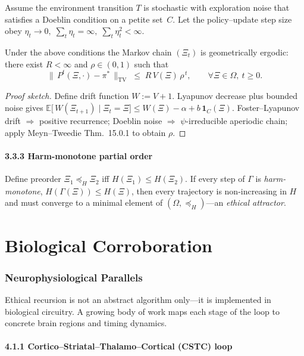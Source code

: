Assume the environment transition $T$ is stochastic with exploration
noise that satisfies a Doeblin condition on a petite set~$C$.
Let the policy–update step size obey
$\eta_t\!\rightarrow\!0,\;
\sum_t\eta_t=\infty,\;
\sum_t\eta_t^2<\infty$.
\begin{theorem}
\label{thm:ergodic}
Under the above conditions the Markov
chain $(\Xi_t)$ is geometrically ergodic:
there exist $R<\infty$ and $\rho\in(0,1)$ such that
\[
  \bigl\|\,P^t(\Xi,\cdot)-\pi^\ast\,\bigr\|_{\mathrm{TV}}
  \;\le\; R\,V(\Xi)\,\rho^{\,t}\!,
  \qquad \forall \Xi\in\Omega,\ t\ge0.
\]
\end{theorem}

\begin{proof}[Proof sketch]
Define drift function $W:=V+1$.
Lyapunov decrease plus bounded noise gives
$\mathbb{E}\!\bigl[\,W(\Xi_{t+1})\mid\Xi_t=\Xi\bigr]\le
W(\Xi)-\alpha+b\,\mathbf 1_C(\Xi)$.
Foster–Lyapunov drift $\Rightarrow$ positive recurrence; Doeblin
noise $\Rightarrow$ $\psi$-irreducible aperiodic chain;
apply Meyn–Tweedie Thm.~15.0.1 to obtain $\rho$.
\end{proof}

\paragraph{3.3.3 Harm-monotone partial order}

Define preorder $\Xi_1\preceq_H \Xi_2$ iff $H(\Xi_1)\le H(\Xi_2)$.
If every step of $\Gamma$ is \emph{harm-monotone},
$H(\Gamma(\Xi))\le H(\Xi)$, then every trajectory
is non-increasing in $H$ and must converge to a minimal element of
$(\Omega,\preceq_H)$—an \emph{ethical attractor}.

\section*{Biological Corroboration}

\subsubsection{Neurophysiological Parallels}
\label{sec:neuro}

Ethical recursion is not an abstract algorithm only---it is implemented
in biological circuitry.  A growing body of work maps each stage of the
loop to concrete brain regions and timing dynamics.

\paragraph{4.1.1 Cortico--Striatal--Thalamo--Cortical (CSTC) loop}

